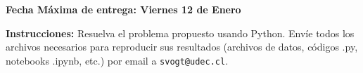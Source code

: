 \documentclass[11pt]{exam}
\begin{document}
\firstpageheadrule
\runningheadrule
{}
\cfoot{ }
\begin{flushleft}
\vspace{0.2in}
\vspace{0.25cm}
\end{flushleft}

\begin{center}
\textbf{Fecha Máxima de entrega: Viernes 12 de Enero}
\end{center}
\textbf{Instrucciones:} \noindent Resuelva el problema propuesto usando Python. Envíe todos los archivos necesarios para reproducir sus resultados (archivos de datos, códigos .py, notebooks .ipynb, etc.) por email a \texttt{svogt@udec.cl}.

\bigskip
\end{document}
